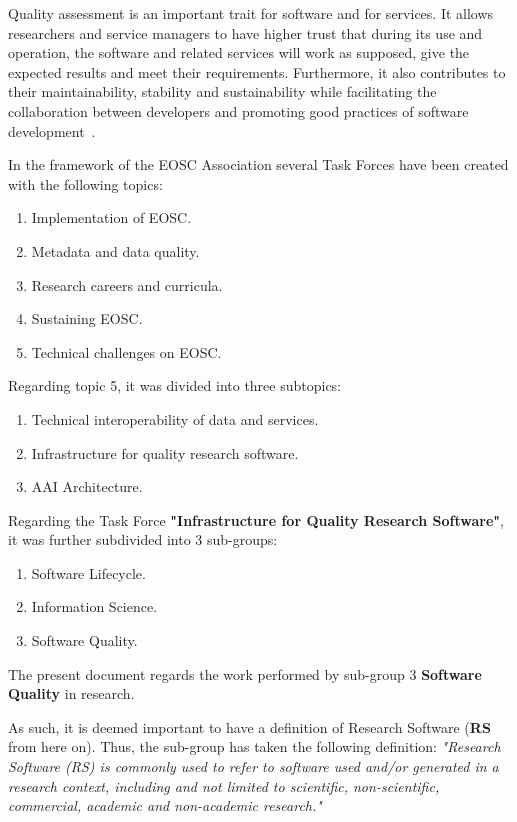Quality assessment is an important trait for software and for services. It allows researchers and service managers to have higher trust that during its use and operation, the software and related services will work as supposed, give the expected results and meet their requirements. Furthermore, it also contributes to their maintainability, stability and sustainability while facilitating the collaboration between developers and promoting good practices of software development~\cite{eosc_synergyD31}.

In the framework of the EOSC Association several Task Forces have been created with the following topics:

\begin{enumerate}
    \item Implementation of EOSC.
    \item Metadata and data quality.
    \item Research careers and curricula.
    \item Sustaining EOSC.
    \item Technical challenges on EOSC.
\end{enumerate}

Regarding topic 5, it was divided into three subtopics:

\begin{enumerate}
    \item Technical interoperability of data and services.
    \item Infrastructure for quality research software.
    \item AAI Architecture.
\end{enumerate}

Regarding the Task Force \textbf{"Infrastructure for Quality Research Software"}, it was further subdivided into 3 sub-groups:

\begin{enumerate}
    \item Software Lifecycle.
    \item Information Science.
    \item Software Quality.
\end{enumerate}

The present document regards the work performed by sub-group 3 \textbf{Software Quality} in research.

As such, it is deemed important to have a definition of Research Software (\textbf{RS} from here on). Thus, the sub-group has taken the following definition: \textit{"Research Software (RS) is commonly used to refer to software used and/or generated in a research context, including and not limited to scientific, non-scientific, commercial, academic and non-academic research."}~\cite{gruenpeter_defining_2021}

